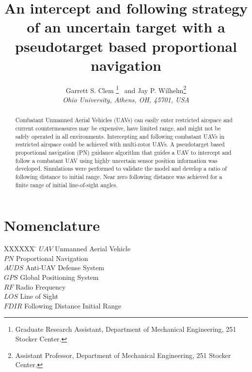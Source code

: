 \documentclass[]{aiaa-tc}%
\title{An intercept and following strategy of an uncertain target with a pseudotarget based proportional navigation}
\author{
  Garrett S. Clem
    \thanks{Graduate Research Assistant, Department of Mechanical Engineering, 251 Stocker Center.}
  \ and Jay P. Wilhelm\thanks{Assistant Professor, Department of Mechanical Engineering, 251 Stocker Center.}\\
  {\normalsize\itshape
   Ohio University, Athens, OH, 45701, USA}\\
   }
\begin{document}
\maketitle

\begin{abstract}
Combatant Unmanned Aerial Vehicles (UAVs) can easily enter restricted airspace and current countermeasures may be expensive, have limited range, and might not be safely operated in all environments. Intercepting and following combatant UAVs in restricted airspace could be achieved with multi-rotor UAVs. A pseudotarget based proportional navigation (PN) guidance algorithm that guides a UAV to intercept and follow a combatant UAV using highly uncertain sensor position information was developed. Simulations were performed to validate the model and develop a ratio of following distance to initial range. Near zero following distance was achieved for a finite range of initial line-of-sight angles.
\end{abstract}

\section*{Nomenclature}
\begin{tabbing}
 XXXXXX  \= \kill%
 $UAV$ \> Unmanned Aerial Vehicle \\
 $PN$ \> Proportional Navigation \\
 $AUDS$ \> Anti-UAV Defense System \\
 $GPS$ \> Global Positioning System \\
 $RF$ \> Radio Frequency \\
 $LOS$ \> Line of Sight \\
 $FDIR$ \> Following Distance Initial Range \\
 \end{tabbing}
 
\end{document}
